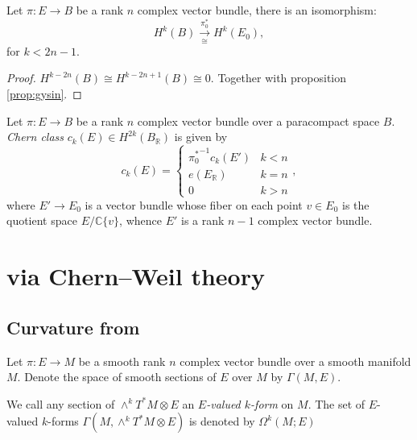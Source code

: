 \documentclass[11pt]{homework}
\theoremstyle{indented}
\begin{document}
\begin{corollary}
    Let $\pi : E\to B$ be a rank $n$ complex vector bundle, there is an isomorphism:
    \begin{equation*}
        H^{k}(B) \xrightarrow[\cong]{\pi_0^*} H^{k}(E_0),
    \end{equation*}
    for $k<2n-1$.
\end{corollary}
\begin{proof}
    $H^{k-2n}(B) \cong H^{k-2n+1}(B) \cong 0$. Together with proposition \ref{prop:gysin}.
\end{proof}

\begin{definition}
    Let $\pi : E\to B$ be a rank $n$ complex vector bundle over a paracompact space $B$. \textit{Chern class} $c_{k}(E) \in H^{2k}(B_{\mathbb {R}})$ is given by
    \begin{equation*}
        c_{k}(E)=\begin{cases}
            {\pi_0^{*}}^{-1}c_{k}(E')&k<n\\
            e(E_{\mathbb {R} })&k=n\\
            0&k>n
        \end{cases},
    \end{equation*}
    where $E' \to E_0$ is a vector bundle whose fiber on each point $v\in E_0$ is the quotient space $E / \mathbb{C}\{v\}$, whence $E'$ is a rank $n-1$ complex vector bundle.
\end{definition}


\section{via Chern–Weil theory}
\subsection{Curvature from}
Let $\pi: E\to M$ be a smooth rank $n$ complex vector bundle over a smooth manifold $M$. Denote the space of smooth sections of $E$ over $M$ by $\Gamma(M,E)$. 

\begin{definition}
    We call any section of $\wedge^k T^*M \otimes E$ an \textit{$E$-valued $k$-form} on $M$. The set of $E$-valued $k$-forms $\Gamma (M, \wedge^k T^{*}M\otimes E)$ is denoted by $\Omega^k(M;E)$
\end{definition}
\end{document}
